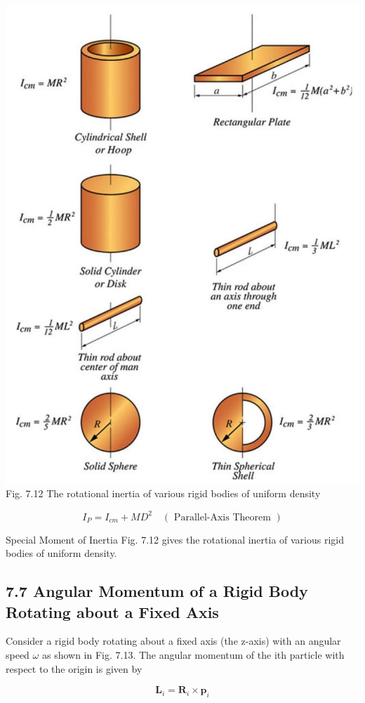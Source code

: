 \documentclass[10pt]{article}
\begin{document}
\includegraphics[max width=\textwidth, center]{2024_09_13_db1f357d2aad0a03eb2eg-118(1)}\\
Fig. 7.12 The rotational inertia of various rigid bodies of uniform density

$$
I_{P}=I_{c m}+M D^{2} \quad(\text { Parallel-Axis Theorem })
$$

Special Moment of Inertia Fig. 7.12 gives the rotational inertia of various rigid bodies of uniform density.

\subsection*{7.7 Angular Momentum of a Rigid Body Rotating about a Fixed Axis}
Consider a rigid body rotating about a fixed axis (the z-axis) with an angular speed $\omega$ as shown in Fig. 7.13. The angular momentum of the ith particle with respect to the origin is given by

$$
\mathbf{L}_{i}=\mathbf{R}_{i} \times \mathbf{p}_{i}
$$
\end{document}
